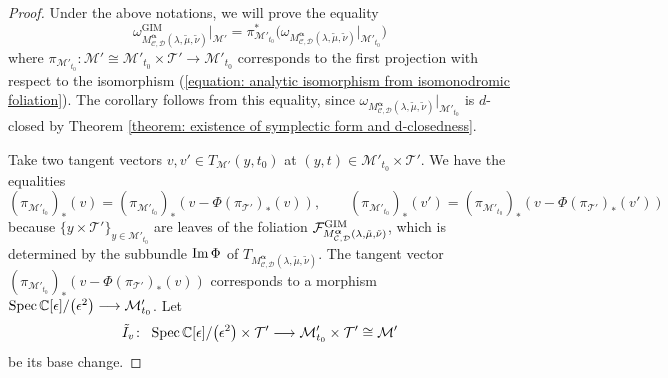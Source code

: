 \documentclass[pdftex]{sigma}
\numberwithin{equation}{section}
\newcommand\im{\mathop{\rm Im}\nolimits}
\newcommand\Spec{\mathop{\rm Spec}\nolimits}
\newcommand{\balpha}{\boldsymbol \alpha}
\begin{document}
\begin{proof}
Under the above notations, we will prove the equality
\begin{equation} \label{equation: isomonodromy 2-form is a pullback}
 \omega_{M^{\balpha}_{{\mathcal C},{\mathcal D}}
 (\lambda,\tilde{\mu},\tilde{\nu})}^{\mathrm{GIM}}\big|_{{\mathcal M}'}
 =
 \pi_{{\mathcal M}'_{t_0}}^* \big(
 \omega_{M^{\balpha}_{{\mathcal C},{\mathcal D}}
 (\lambda,\tilde{\mu},\tilde{\nu})}\big|_{{\mathcal M}'_{t_0}} \big)
\end{equation}
where
$\pi_{{\mathcal M}'_{t_0}} \colon {\mathcal M}'\cong {\mathcal M}'_{t_0}\times{\mathcal T'}
\longrightarrow {\mathcal M}'_{t_0}$
corresponds to the first projection with respect to the isomorphism
(\ref{equation: analytic isomorphism from isomonodromic foliation}).
The corollary follows from this equality, since
$\omega_{M^{\balpha}_{{\mathcal C},{\mathcal D}}
(\lambda,\tilde{\mu},\tilde{\nu})}|_{{\mathcal M}'_{t_0}}$
is $d$-closed by Theorem \ref{theorem: existence of symplectic form and d-closedness}.

Take two tangent vectors
$v,v'\in T_{{\mathcal M}'}(y,t_0)$
at $(y,t)\in{\mathcal M}'_{t_0}\times{\mathcal T'}$.
We have the equalities
\[
(\pi_{{\mathcal M}'_{t_0}})_*(v)=(\pi_{{\mathcal M}'_{t_0}})_*(v-\Phi(\pi_{\mathcal T'})_*(v)),
\qquad
(\pi_{{\mathcal M}'_{t_0}})_*(v')=(\pi_{{\mathcal M}'_{t_0}})_*(v-\Phi(\pi_{\mathcal T'})_*(v'))
\]
because $\{ y\times{\mathcal T'}\}_{y\in{\mathcal M}'_{t_0}}$
are leaves of the foliation
${\mathcal F}^{\rm GIM}_{M^{\balpha}_{{\mathcal C},{\mathcal D}}
(\lambda,\tilde{\mu},\tilde{\nu})}$,
which is determined by the subbundle $\im\Phi$
of $T_{M^{\balpha}_{{\mathcal C},{\mathcal D}}
(\lambda,\tilde{\mu},\tilde{\nu}) }$.
The tangent vector
$(\pi_{{\mathcal M}'_{t_0}})_*(v-\Phi(\pi_{\mathcal T'})_*(v))$
corresponds to
a morphism
$\Spec\mathbb{C}[\epsilon]/\big(\epsilon^2\big)\longrightarrow
{\mathcal M}'_{t_0}$.
Let{\samepage
\[
 \tilde{I}_v\colon \
 \Spec\mathbb{C}[\epsilon]/\big(\epsilon^2\big)\times{\mathcal T'}
 \longrightarrow {\mathcal M}'_{t_0}\times{\mathcal T'}
 \cong{\mathcal M}'
\]
be its base change.}


\end{proof}
\end{document}
